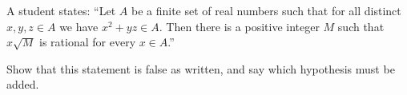 A student states: ``Let $A$ be a finite set of real numbers such that for all distinct $x,y,z\in A$ we have $x^2+yz\in A$. Then there is a positive integer $M$ such that $x\sqrt M$ is rational for every $x\in A$.''

Show that this statement is false as written, and say which hypothesis must be added.
